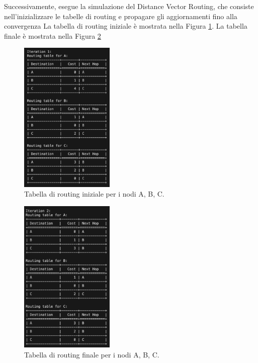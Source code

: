 \documentclass{report}
\begin{document}
Successivamente, esegue la simulazione del Distance Vector Routing, che consiste nell'inizializzare le tabelle di routing e propagare gli aggiornamenti fino alla convergenza La tabella di routing iniziale è mostrata nella Figura \ref{fig:initial_routing_table_1}. La tabella finale è mostrata nella Figura \ref{fig:final_routing_table_1}

\begin{figure}[H]
    \centering
    \includegraphics[width=0.4\textwidth]{img/rete1inizio.png}
    \caption{Tabella di routing iniziale per i nodi A, B, C.}
    \label{fig:initial_routing_table_1}
\end{figure}

\begin{figure}[H]
    \centering
    \includegraphics[width=0.4\textwidth]{img/rete1fine.png}
    \caption{Tabella di routing finale per i nodi A, B, C.}
    \label{fig:final_routing_table_1}
\end{figure}
\end{document}
